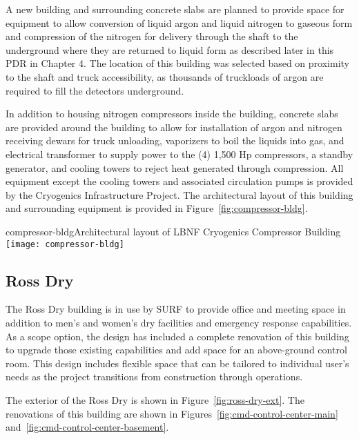 A new building and surrounding concrete slabs are planned to provide space for equipment to allow conversion of liquid argon and liquid nitrogen to gaseous form and compression of the nitrogen for delivery through the shaft to the underground where they are returned to liquid form as described later in this PDR in Chapter 4.  The location of this building was selected based on proximity to the shaft and truck accessibility, as thousands of truckloads of argon are required to fill the detectors underground.

In addition to housing nitrogen compressors inside the building, concrete slabs are provided around the building to allow for installation of argon and nitrogen receiving dewars for truck unloading, vaporizers to boil the liquids into gas, and electrical transformer to supply power to the (4) 1,500 Hp compressors, a standby generator, and cooling towers to reject heat generated through compression. All equipment except the cooling towers and associated circulation pumps is provided by the Cryogenics Infrastructure Project. The architectural layout of this building and surrounding equipment is provided in Figure~\ref{fig:compressor-bldg}.

\begin{cdrfigure}{compressor-bldg}{Architectural layout of LBNF Cryogenics Compressor Building}
\texttt{[image: compressor-bldg]}
\end{cdrfigure}


\subsection{Ross Dry}
\label{sec:fscf-surf-facil-surface-bldg-rossdry}

The Ross Dry building is in use by SURF to provide office and meeting space in addition to men's and women's dry facilities and emergency response capabilities. As a scope option, the design has included a complete renovation of this building to upgrade those existing capabilities and add space for an above-ground control room.  This design includes flexible space that can be tailored to individual user's needs as the project transitions from construction through operations. 

The exterior of the Ross Dry is shown in Figure~\ref{fig:ross-dry-ext}. The renovations of this building are shown in Figures~\ref{fig:cmd-control-center-main} and~\ref{fig:cmd-control-center-basement}.

